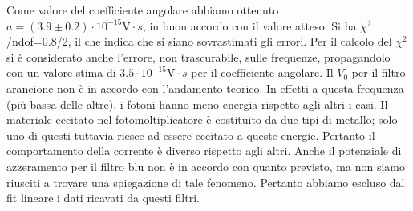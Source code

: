 \documentclass[10pt,a4paper]{article}
\begin{document}
Come valore del coefficiente angolare abbiamo ottenuto $a = (3.9\pm 0.2)\cdot10^{-15} \mbox{V}\cdot{s}$, in buon accordo con il valore atteso.
Si ha $\chi ^2$/ndof=0.8/2, il che indica che si siano sovrastimati gli errori.
Per il calcolo del $\chi^2$ si è considerato anche l'errore, non trascurabile, sulle frequenze, propagandolo con un valore stima di $3.5\cdot 10^{-15}\mbox{V}\cdot{s}$ per il coefficiente angolare.
Il $V_0$ per il filtro arancione non è in accordo con l'andamento teorico. In effetti a questa frequenza (più bassa delle altre), i fotoni hanno meno energia rispetto agli altri i casi. Il materiale eccitato nel fotomoltiplicatore è costituito da due tipi di metallo; solo uno di questi tuttavia riesce ad essere eccitato a queste energie. Pertanto il comportamento della corrente è  diverso rispetto agli altri.
Anche il potenziale di azzeramento per il filtro blu non è in accordo con quanto previsto, ma non siamo riusciti a trovare una spiegazione di tale fenomeno. Pertanto abbiamo escluso dal fit lineare i dati ricavati da questi filtri.
\end{document}
